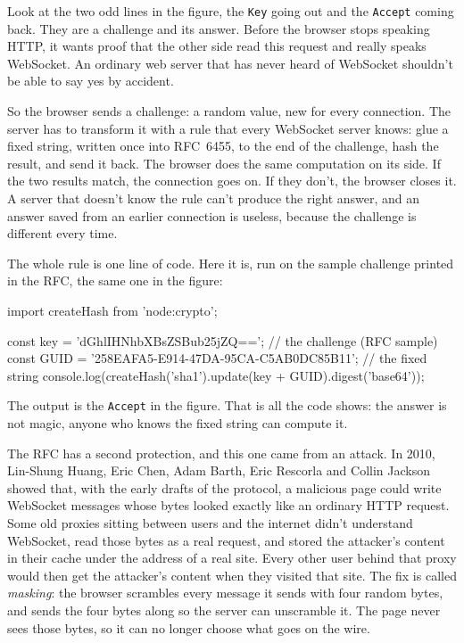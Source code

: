 Look at the two odd lines in the figure, the \texttt{Key} going out and the
\texttt{Accept} coming back. They are a challenge and its answer. Before the
browser stops speaking HTTP, it wants proof that the other side read this
request and really speaks WebSocket. An ordinary web server that has never
heard of WebSocket shouldn't be able to say yes by accident.

So the browser sends a challenge: a random value, new for every connection.
The server has to transform it with a rule that every WebSocket server knows:
glue a fixed string, written once into RFC~6455, to the end of the challenge,
hash the result, and send it back. The browser does the same computation on its
side. If the two results match, the connection goes on. If they don't, the
browser closes it. A server that doesn't know the rule can't produce the right
answer, and an answer saved from an earlier connection is useless, because the
challenge is different every time.

The whole rule is one line of code. Here it is, run on the sample challenge
printed in the RFC, the same one in the figure:

\begin{code}
import { createHash } from 'node:crypto';

const key = 'dGhlIHNhbXBsZSBub25jZQ==';            // the challenge (RFC sample)
const GUID = '258EAFA5-E914-47DA-95CA-C5AB0DC85B11'; // the fixed string
console.log(createHash('sha1').update(key + GUID).digest('base64'));
\end{code}


The output is the \texttt{Accept} in the figure. That is all the code shows:
the answer is not magic, anyone who knows the fixed string can compute it.

The RFC has a second protection, and this one came from an attack. In 2010,
Lin-Shung Huang, Eric Chen, Adam Barth, Eric Rescorla and Collin Jackson showed
that, with the early drafts of the protocol, a malicious page could write
WebSocket messages whose bytes looked exactly like an ordinary HTTP request.
Some old proxies sitting between users and the internet didn't understand
WebSocket, read those bytes as a real request, and stored the attacker's content
in their cache under the address of a real site. Every other user behind that
proxy would then get the attacker's content when they visited that site. The
fix is called \emph{masking}: the browser scrambles every message it sends with
four random bytes, and sends the four bytes along so the server can unscramble
it. The page never sees those bytes, so it can no longer choose what goes
on the wire.

